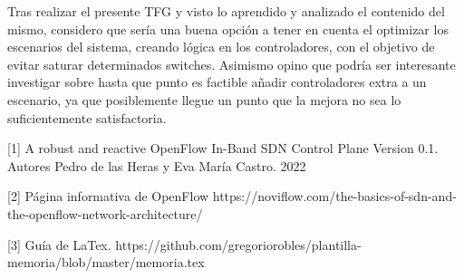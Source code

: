\documentclass[a4paper, 12pt]{book}
\begin{document}
	Tras realizar el presente TFG y visto lo aprendido y analizado el contenido del mismo, considero que sería una buena opción a tener en cuenta el optimizar los escenarios del sistema, creando lógica en los controladores, con el objetivo de evitar saturar determinados switches. Asimismo opino que podría ser interesante investigar sobre hasta que punto es factible añadir controladores extra a un escenario, ya que posiblemente llegue un punto que la mejora no sea lo suficientemente satisfactoria.
	
	
	
	\cleardoublepage
	
	
	\cleardoublepage
	
	
	 
	
	[1]  A robust and reactive
	OpenFlow In-Band SDN Control Plane
	Version 0.1. Autores Pedro de las Heras y Eva María Castro. 2022
	
	[2]  Página informativa de OpenFlow https://noviflow.com/the-basics-of-sdn-and-the-openflow-network-architecture/ 
		
	[3]  Guía de LaTex.  https://github.com/gregoriorobles/plantilla-memoria/blob/master/memoria.tex
	
	
 	
	
\end{document}
